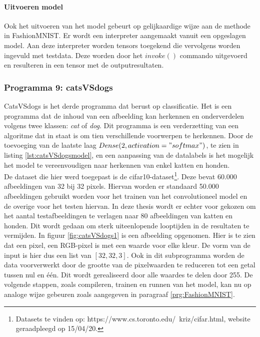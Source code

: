 	
			
				\paragraph{Uitvoeren model}
					Ook het uitvoeren van het model gebeurt op gelijkaardige wijze aan de methode in FashionMNIST. Er wordt een interpreter aangemaakt vanuit een opgeslagen model. Aan deze interpreter worden tensors toegekend die vervolgens worden ingevuld met testdata. Deze worden door het $invoke()$ commando uitgevoerd en resulteren in een tensor met de outputresultaten.
				
		\subsubsection{Programma 9: catsVSdogs}
			CatsVSdogs is het derde programma dat berust op classificatie. Het is een programma dat de inhoud van een afbeelding kan herkennen en onderverdelen volgens twee klassen: \textit{cat} of \textit{dog}. Dit programma is een verderzetting van een algoritme dat in staat is om tien verschillende voorwerpen te herkennen. Door de toevoeging van de laatste laag $Dense(2, activation="softmax")$, te zien in listing \ref{lst:catsVSdogsmodel}, en een aanpassing van de datalabels is het mogelijk het model te vereenvoudigen naar herkennen van enkel katten en honden. \\
			\newpage
			De dataset die hier werd toegepast is de cifar10-dataset\footnote{Datasets te vinden op: https://www.cs.toronto.edu/~kriz/cifar.html, website geraadpleegd op 15/04/20.}. Deze bevat 60.000 afbeeldingen van 32 bij 32 pixels. Hiervan worden er standaard 50.000 afbeeldingen gebruikt worden voor het trainen van het convolutioneel model en de overige voor het testen hiervan. In deze thesis wordt er echter voor gekozen om het aantal testafbeeldingen te verlagen naar 80 afbeeldingen van katten en honden. Dit wordt gedaan om sterk uiteenlopende looptijden in de resultaten te vermijden. In figuur \ref{fig:catsVSdogs1} is een afbeelding opgenomen. Hier is te zien dat een pixel, een RGB-pixel is met een waarde voor elke kleur. De vorm van de input is hier dus een list van $[32, 32, 3]$. Ook in dit subprogramma worden de data voorverwerkt door de grootte van de pixelwaarden te reduceren tot een getal tussen nul en \'e\'en. Dit wordt gerealiseerd door alle waardes te delen door 255. De volgende stappen, zoals compileren, trainen en runnen van het model, kan nu op analoge wijze gebeuren zoals aangegeven in paragraaf \ref{prg:FashionMNIST}.

